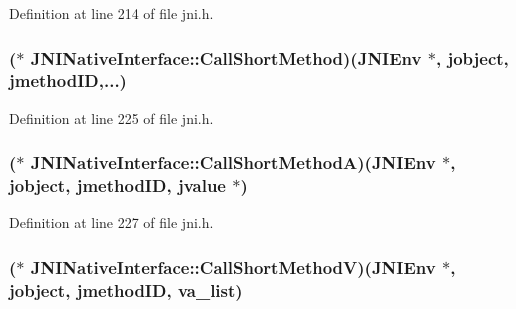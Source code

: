Definition at line 214 of file jni.\-h.

\hypertarget{struct_j_n_i_native_interface_abdb53c57fc194a7c1b12cd24f56b0747}{
\subsubsection[{Call\-Short\-Method}]{($\ast$ J\-N\-I\-Native\-Interface\-::\-Call\-Short\-Method)({\bf J\-N\-I\-Env} $\ast$, {\bf jobject}, {\bf jmethod\-I\-D},...)}}\label{struct_j_n_i_native_interface_abdb53c57fc194a7c1b12cd24f56b0747}


Definition at line 225 of file jni.\-h.

\hypertarget{struct_j_n_i_native_interface_a2c404edabb19a95d098b7d630478a3d5}{
\subsubsection[{Call\-Short\-Method\-A}]{($\ast$ J\-N\-I\-Native\-Interface\-::\-Call\-Short\-Method\-A)({\bf J\-N\-I\-Env} $\ast$, {\bf jobject}, {\bf jmethod\-I\-D}, {\bf jvalue} $\ast$)}}\label{struct_j_n_i_native_interface_a2c404edabb19a95d098b7d630478a3d5}


Definition at line 227 of file jni.\-h.

\hypertarget{struct_j_n_i_native_interface_ab4860cd0b08d0eaf0a248e6977d7efd5}{
\subsubsection[{Call\-Short\-Method\-V}]{($\ast$ J\-N\-I\-Native\-Interface\-::\-Call\-Short\-Method\-V)({\bf J\-N\-I\-Env} $\ast$, {\bf jobject}, {\bf jmethod\-I\-D}, va\-\_\-list)}}\label{struct_j_n_i_native_interface_ab4860cd0b08d0eaf0a248e6977d7efd5}



